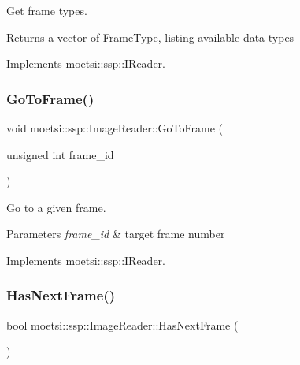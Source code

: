 Get frame types. 

\begin{DoxyReturn}{Returns}
a vector of Frame\+Type, listing available data types 
\end{DoxyReturn}


Implements \hyperlink{classmoetsi_1_1ssp_1_1IReader_a4116c1931fde7bd66133934ffdca1cce}{moetsi\+::ssp\+::\+I\+Reader}.

\mbox{\label{classmoetsi_1_1ssp_1_1ImageReader_a32eb88cc612e6920f4910e0803b0ce3c}} 
\subsubsection{\texorpdfstring{Go\+To\+Frame()}{GoToFrame()}}
{\footnotesize\ttfamily void moetsi\+::ssp\+::\+Image\+Reader\+::\+Go\+To\+Frame (\begin{DoxyParamCaption}\item[{unsigned int}]{frame\+\_\+id }\end{DoxyParamCaption})\hspace{0.3cm}{\ttfamily [virtual]}}



Go to a given frame. 


\begin{DoxyParams}{Parameters}
{\em frame\+\_\+id} & target frame number \\
\hline
\end{DoxyParams}


Implements \hyperlink{classmoetsi_1_1ssp_1_1IReader_a6f1be3c06538992cca6d550bd9566681}{moetsi\+::ssp\+::\+I\+Reader}.

\mbox{\label{classmoetsi_1_1ssp_1_1ImageReader_ad8e87720ca0ec97de501f1070119b28d}} 
\subsubsection{\texorpdfstring{Has\+Next\+Frame()}{HasNextFrame()}}
{\footnotesize\ttfamily bool moetsi\+::ssp\+::\+Image\+Reader\+::\+Has\+Next\+Frame (\begin{DoxyParamCaption}{ }\end{DoxyParamCaption})\hspace{0.3cm}{\ttfamily [virtual]}}



